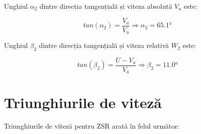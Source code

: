 Unghiul $\alpha_2$ dintre direcția tangențială și viteza absolută $V_u$ este:

\begin{equation}
tan(\alpha_{2 })=\frac{V_{a}}{V_{u}} \Rightarrow \alpha_{2}=65.1\si{\degree}
\end{equation}



Unghiul $\beta_2$ dintre direcția tangențială și viteza relativă $W_2$ este:

\begin{equation}
tan(\beta_{2})=\frac{U - V_u}{V_a} \Rightarrow \beta_{2} =11.0\si{\degree}
\end{equation}


\section{Triunghiurile de viteză}

Triunghiurile de viteză pentru ZSR arată în felul următor:

